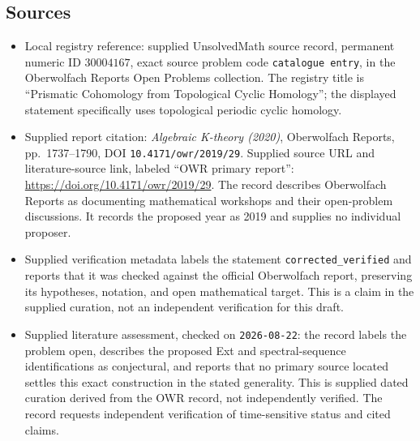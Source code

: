 \documentclass[11pt]{article}
\begin{document}
\subsection{Sources}
\begin{itemize}
\item Local registry reference: supplied UnsolvedMath source record, permanent numeric ID \(30004167\), exact source problem code \texttt{catalogue entry}, in the Oberwolfach Reports Open Problems collection. The registry title is ``Prismatic Cohomology from Topological Cyclic Homology''; the displayed statement specifically uses topological periodic cyclic homology.
\item Supplied report citation: \emph{Algebraic K-theory (2020)}, Oberwolfach Reports, pp.~1737--1790, DOI \texttt{10.4171/owr/2019/29}. Supplied source URL and literature-source link, labeled ``OWR primary report'': \url{https://doi.org/10.4171/owr/2019/29}. The record describes Oberwolfach Reports as documenting mathematical workshops and their open-problem discussions. It records the proposed year as 2019 and supplies no individual proposer.
\item Supplied verification metadata labels the statement \texttt{corrected\_verified} and reports that it was checked against the official Oberwolfach report, preserving its hypotheses, notation, and open mathematical target. This is a claim in the supplied curation, not an independent verification for this draft.
\item Supplied literature assessment, checked on \texttt{2026-08-22}: the record labels the problem open, describes the proposed Ext and spectral-sequence identifications as conjectural, and reports that no primary source located settles this exact construction in the stated generality. This is supplied dated curation derived from the OWR record, not independently verified. The record requests independent verification of time-sensitive status and cited claims.
\end{itemize}
\end{document}
